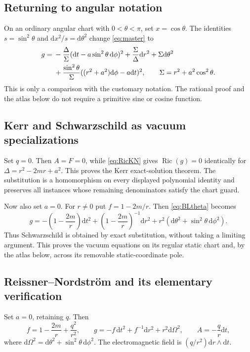 \documentclass[11pt,a4paper]{article}
\numberwithin{equation}{section}
\theoremstyle{definition}\newtheorem{definition}[theorem]{Definition}
\theoremstyle{remark}\newtheorem{remark}[theorem]{Remark}
\newcommand{\Ric}{\operatorname{Ric}}
\newcommand{\dd}{\mathrm{d}}
\begin{document}
\subsection{Returning to angular notation}
On an ordinary angular chart with $0<\theta<\pi$, set $x=\cos\theta$. The identities $s=\sin^2\theta$ and $\dd x^2/s=\dd\theta^2$ change \eqref{eq:master} to
\begin{align}
 g={}&-\frac{\Delta}{\Sigma}(\dd t-a\sin^2\theta\,\dd\phi)^2
 +\frac\Sigma\Delta\dd r^2+\Sigma\dd\theta^2\notag\\
 &+\frac{\sin^2\theta}{\Sigma}
       ((r^2+a^2)\dd\phi-a\dd t)^2,
 \qquad \Sigma=r^2+a^2\cos^2\theta.\label{eq:BLtheta}
\end{align}
This is only a comparison with the customary notation. The rational proof and the atlas below do not require a primitive sine or cosine function.

\subsection{Kerr and Schwarzschild as vacuum specializations}
Set $q=0$. Then $A=F=0$, while \eqref{eq:RicKN} gives $\Ric(g)=0$ identically for $\Delta=r^2-2mr+a^2$. This proves the Kerr exact-solution theorem. The substitution is a homomorphism on every displayed polynomial identity and preserves all instances whose remaining denominators satisfy the chart guard.

Now also set $a=0$. For $r\ne0$ put $f=1-2m/r$. Then \eqref{eq:BLtheta} becomes
\begin{equation}\label{eq:Schw}
 g=-\left(1-\frac{2m}{r}\right)\dd t^2
   +\left(1-\frac{2m}{r}\right)^{-1}\dd r^2
   +r^2(\dd\theta^2+\sin^2\theta\,\dd\phi^2).
\end{equation}
Thus Schwarzschild is obtained by exact substitution, without taking a limiting argument. This proves the vacuum equations on its regular static chart and, by the atlas below, across its removable static-coordinate pole.

\subsection{Reissner--Nordstr\"om and its elementary verification}
Set $a=0$, retaining $q$. Then
\begin{equation}\label{eq:RN}
 f=1-\frac{2m}{r}+\frac{q^2}{r^2},\qquad
 g=-f\,\dd t^2+f^{-1}\dd r^2+r^2\dd\Omega^2,
 \qquad A=-\frac qr\dd t,
\end{equation}
where $\dd\Omega^2=\dd\theta^2+\sin^2\theta\,\dd\phi^2$. The electromagnetic field is $(q/r^2)\dd r\wedge\dd t$.
\end{document}
